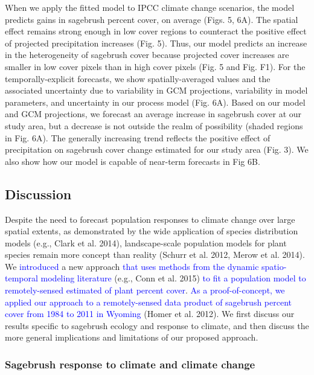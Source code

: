 \documentclass[12pt,]{article}
\begin{document}
When we apply the fitted model to IPCC climate change scenarios, the
model predicts gains in sagebrush percent cover, on average (Figs. 5,
6A). The spatial effect remains strong enough in low cover regions to
counteract the positive effect of projected precipitation increases
(Fig. 5). Thus, our model predicts an increase in the heterogeneity of
sagebrush cover because projected cover increases are smaller in low
cover pixels than in high cover pixels (Fig. 5 and Fig. F1). For the
temporally-explicit forecasts, we show spatially-averaged values and the
associated uncertainty due to variability in GCM projections,
variability in model parameters, and uncertainty in our process model
(Fig. 6A). Based on our model and GCM projections, we forecast an
average increase in sagebrush cover at our study area, but a decrease is
not outside the realm of possibility (shaded regions in Fig. 6A). The
generally increasing trend reflects the positive effect of precipitation
on sagebrush cover change estimated for our study area (Fig. 3). We also
show how our model is capable of near-term forecasts in Fig 6B.

\subsection{Discussion}\label{discussion}

Despite the need to forecast population responses to climate change over
large spatial extents, as demonstrated by the wide application of
species distribution models (e.g., Clark et al. 2014), landscape-scale
population models for plant species remain more concept than reality
(Schurr et al. 2012, Merow et al. 2014). We \textcolor{blue}{introduced}
a new approach
\textcolor{blue}{that uses methods from the dynamic spatio-temporal modeling literature}
(e.g., Conn et al. 2015)
\textcolor{blue}{to fit a population model to remotely-sensed estimated of plant percent cover}.
\textcolor{blue}{As a proof-of-concept, we applied our approach to a remotely-sensed data product of sagebrush percent cover from 1984 to 2011 in Wyoming}
(Homer et al. 2012). We first discuss our results specific to sagebrush
ecology and response to climate, and then discuss the more general
implications and limitations of our proposed approach.

\subsubsection{Sagebrush response to climate and climate
change}\label{sagebrush-response-to-climate-and-climate-change}
\end{document}
